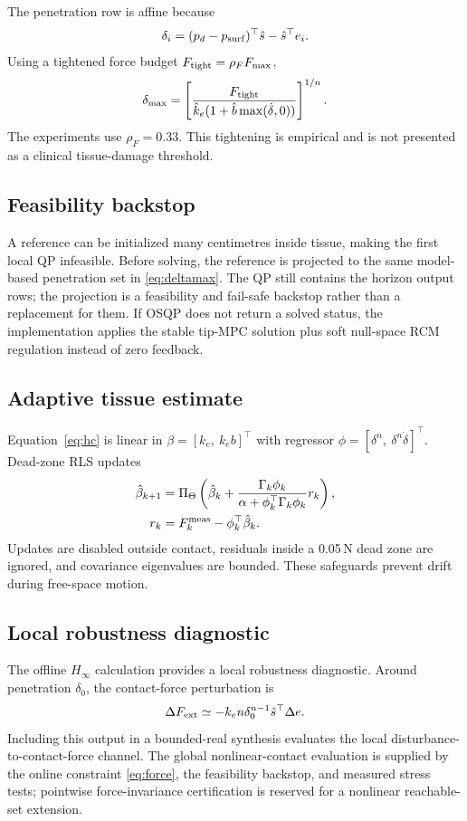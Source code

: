 The penetration row is affine because
\begin{equation}
\delta_i=(p_d-p_{\rm surf})^\top\hat s-\hat s^\top e_i.
\end{equation}
Using a tightened force budget $F_{\rm tight}=\rho_FF_{\max}$,
\begin{equation}
\delta_{\max}=
\left[\frac{F_{\rm tight}}
{\hat k_e(1+\hat b\max(\dot\delta,0))}\right]^{1/n}.
\label{eq:deltamax}
\end{equation}
The experiments use $\rho_F=0.33$. This tightening is empirical and is not presented as a clinical tissue-damage threshold.

\subsection{Feasibility backstop}

A reference can be initialized many centimetres inside tissue, making the first local QP infeasible. Before solving, the reference is projected to the same model-based penetration set in \eqref{eq:deltamax}. The QP still contains the horizon output rows; the projection is a feasibility and fail-safe backstop rather than a replacement for them. If OSQP does not return a solved status, the implementation applies the stable tip-MPC solution plus soft null-space RCM regulation instead of zero feedback.

\subsection{Adaptive tissue estimate}

Equation~\eqref{eq:hc} is linear in $\beta=[k_e,\ k_eb]^\top$ with regressor $\phi=[\delta^n,\ \delta^n\dot\delta]^\top$. Dead-zone RLS updates
\begin{align}
\hat\beta_{k+1}&=\Pi_\Theta\left(\hat\beta_k+
\frac{\Gamma_k\phi_k}{\alpha+\phi_k^\top\Gamma_k\phi_k}r_k\right),\\
r_k&=F_k^{\rm meas}-\phi_k^\top\hat\beta_k.
\end{align}
Updates are disabled outside contact, residuals inside a 0.05\,N dead zone are ignored, and covariance eigenvalues are bounded. These safeguards prevent drift during free-space motion.

\subsection{Local robustness diagnostic}

The offline $H_\infty$ calculation provides a local robustness diagnostic. Around penetration $\delta_0$, the contact-force perturbation is
\begin{equation}
\Delta F_{\rm ext}\simeq
-k_en\delta_0^{n-1}\hat s^\top\Delta e.
\label{eq:localforce}
\end{equation}
Including this output in a bounded-real synthesis evaluates the local disturbance-to-contact-force channel. The global nonlinear-contact evaluation is supplied by the online constraint \eqref{eq:force}, the feasibility backstop, and measured stress tests; pointwise force-invariance certification is reserved for a nonlinear reachable-set extension.

